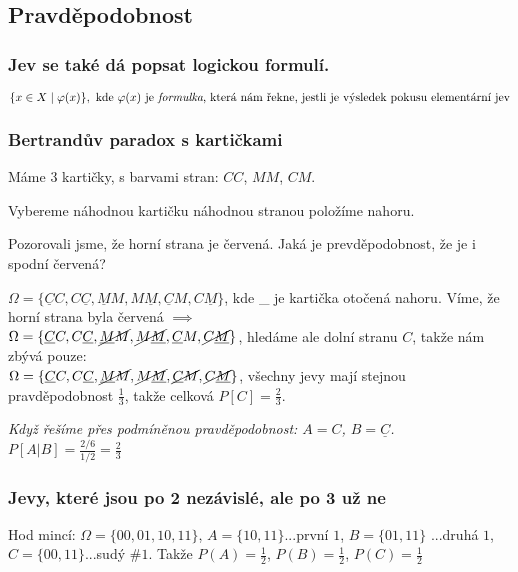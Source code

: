 \documentclass[10pt,a4paper]{article}
\begin{document}
\subsection{Pravděpodobnost}

\subsubsection{Jev se také dá popsat logickou formulí.}

\[
    \{x\in X \mid \varphi (x)\}, \text{ kde $\varphi (x)$ je \textit{formulka}, která nám řekne, jestli je výsledek pokusu elementární jev}
\]

\subsubsection{Bertrandův paradox s kartičkami}

Máme $3$ kartičky, s barvami stran: $CC$, $MM$, $CM$.

Vybereme náhodnou kartičku náhodnou stranou položíme nahoru.

Pozorovali jsme, že horní strana je červená. Jaká je prevděpodobnost, že je i spodní červená?

$\Omega = \{\underline{C}C, C\underline{C}, \underline{M}M, M\underline{M}, \underline{C}M, C\underline{M}\}$, kde \_ je kartička otočená nahoru. Víme, že horní strana byla červená $\implies$\\
$\Omega = \{\underline{C}C, C\underline{C}, \cancel{\underline{M}M}, \cancel{M\underline{M}}, \underline{C}M, \cancel{C\underline{M}}\}$, hledáme ale dolní stranu $C$, takže nám zbývá pouze:\\
$\Omega = \{\underline{C}C, C\underline{C}, \cancel{\underline{M}M}, \cancel{M\underline{M}}, \cancel{\underline{C}M}, \cancel{C\underline{M}}\}$, všechny jevy mají stejnou pravděpodobnost $\frac 13$, takže celková $P[C] = \frac 23$.

\textit{Když řešíme přes podmíněnou pravděpodobnost: $A = C$, $B = \underline{C}$. $P[A|B] = \frac{2/6}{1/2} = \frac 23$}
\subsubsection{Jevy, které jsou po 2 nezávislé, ale po 3 už ne}

Hod mincí: $\Omega = \{00, 01, 10, 11\}$, $A = \{10, 11\}$...první $1$, $B = \{01, 11\}$ ...druhá $1$, $C = \{00,11\}$...sudý $\#1$. Takže 
$P(A)=\frac 12$, $P(B)=\frac 12$, $P(C)=\frac 12$
\end{document}
